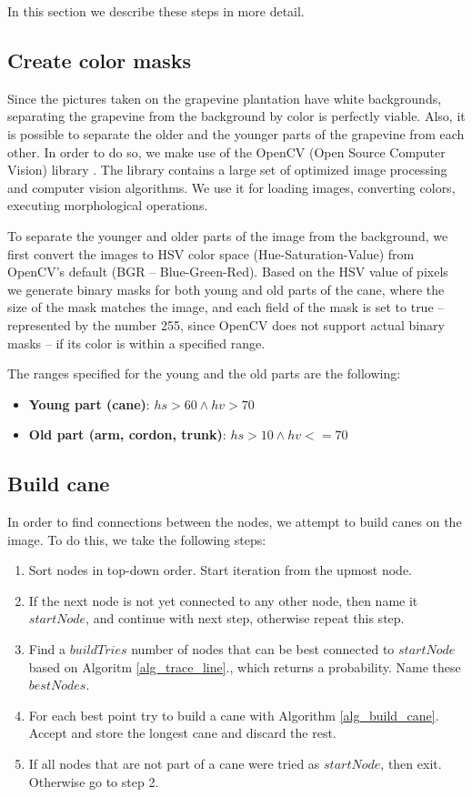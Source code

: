 \documentclass{PSAIE}%
\begin{document}
In this section we describe these steps in more detail.

\subsection{Create color masks} \label{sec_create_color_masks}
Since the pictures taken on the grapevine plantation have white backgrounds, separating the grapevine
from the background by color is perfectly viable. Also, it is possible to separate the older and the
younger parts of the grapevine from each other. In order to do so, we make use of the OpenCV
(Open Source Computer Vision)
library \cite{opencv_library}. The library contains a large set of optimized image processing and computer
vision algorithms. We use it for loading images, converting colors, executing morphological operations.

To separate the younger and older parts of the image from the background, we first convert the images
to HSV color space (Hue-Saturation-Value) from OpenCV's default (BGR -- Blue-Green-Red). Based on the
HSV value of pixels we generate binary masks for both young and old parts of the cane, where the size
of the mask matches the image, and each field of the mask is set to true -- represented by the number 255,
since OpenCV does not support actual binary masks -- if its color is within a specified range.

The ranges specified for the young and the old parts are the following:

\begin{itemize}
      \item \textbf{Young part (cane)}: $hs > 60 \wedge hv > 70$
      \item \textbf{Old part (arm, cordon, trunk)}: $hs > 10 \wedge hv <= 70$
\end{itemize}

\subsection{Build cane} \label{sec_build_cane}
In order to find connections between the nodes, we attempt to build canes on the image. To do this,
we take the following steps:
\begin{enumerate}
      \item Sort nodes in top-down order. Start iteration from the upmost node.
      \item If the next node is not yet connected to any other node, then name it $startNode$, and continue
            with next step, otherwise repeat this step.
      \item Find a $buildTries$ number of nodes that can be best connected to $startNode$ based on Algoritm
            \ref{alg_trace_line}., which returns a probability. Name these $bestNodes$.
      \item For each best point try to build a cane with Algorithm \ref{alg_build_cane}.
            Accept and store the longest cane and discard the rest.
      \item If all nodes that are not part of a cane were tried as $startNode$, then exit. Otherwise go to step
            2.
\end{enumerate}
\end{document}
